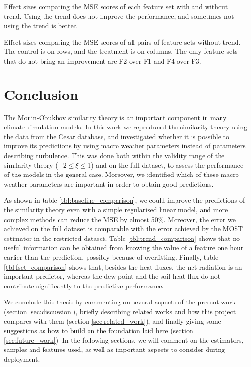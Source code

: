 \documentclass[a4paper,11pt]{kth-mag}
\begin{document}
\begin{table}
\caption{Effect sizes comparing the MSE scores of each feature set with and without trend. Using the trend does not improve the performance, and sometimes not using the trend is better.}
\label{tbl:trend_comparison}

\end{table}

\begin{table}
\caption{Effect sizes comparing the MSE scores of all pairs of feature sets without trend. The control is on rows, and the treatment is on columns. The only feature sets that do not bring an improvement are F2 over F1 and F4 over F3.}
\label{tbl:fset_comparison}

\end{table}


\chapter{Conclusion}
\label{ch:conclusion}
The Monin-Obukhov similarity theory is an important component in many climate simulation models. In this work we reproduced the similarity theory using the data from the Cesar database, and investigated whether it is possible to improve its predictions by using macro weather parameters instead of parameters describing turbulence. This was done both within the validity range of the similarity theory ($-2\leq\xi\leq1$) and on the full dataset, to assess the performance of the models in the general case. Moreover, we identified which of these macro weather parameters are important in order to obtain good predictions.

As shown in table \ref{tbl:baseline_comparison}, we could improve the predictions of the similarity theory even with a simple regularized linear model, and more complex methods can reduce the MSE by almost 50\%. Moreover, the error we achieved on the full dataset is comparable with the error achieved by the MOST estimator in the restricted dataset. Table \ref{tbl:trend_comparison} shows that no useful information can be obtained from knowing the value of a feature one hour earlier than the prediction, possibly because of overfitting. Finally, table \ref{tbl:fset_comparison} shows that, besides the heat fluxes, the net radiation is an important predictor, whereas the dew point and the soil heat flux do not contribute significantly to the predictive performance.

We conclude this thesis by commenting on several aspects of the present work (section \ref{sec:discussion}), briefly describing related works and how this project compares with them (section \ref{sec:related_work}), and finally giving some suggestions as how to build on the foundation laid here (section \ref{sec:future_work}). In the following sections, we will comment on the estimators, samples and features used, as well as important aspects to consider during deployment.
\end{document}
